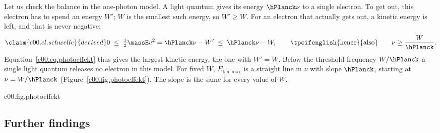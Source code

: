 Let us check the balance in the one-photon model. A light quantum gives its energy
$\hPlanck\nu$ to a single electron. To get out, this electron has to spend an energy $W'$;
$W$ is the smallest such energy, so $W' \geq W$. For an electron that actually gets out,
a kinetic energy is left, and that is never negative:
\begin{equation}\label{c00.eq.schwelle}\claim{c00.cl.schwelle}{derived}
  0 \;\leq\; \tfrac12 \massE v^2 = \hPlanck\nu - W' \;\leq\; \hPlanck\nu - W,
  \qquad \text{\tpcifenglish{hence}{also}} \qquad
  \nu \geq \frac{W}{\hPlanck} .
\end{equation}
Equation~\eqref{c00.eq.photoeffekt} thus gives the largest kinetic energy, the one with
$W' = W$. Below the threshold frequency $W/\hPlanck$ a single light quantum releases no
electron in this model. For fixed $W$, $E_{\mathrm{kin,max}}$ is a straight line in $\nu$ with slope $\hPlanck$, starting at $\nu = W/\hPlanck$
(Figure~\ref{c00.fig.photoeffekt}). The slope is the same for every value of $W$.

\begin{tpcfigure}{c00.fig.photoeffekt}
  \caption{The maximum kinetic energy~\eqref{c00.eq.photoeffekt} of the photoelectrons,
    plotted for two fixed values of the binding energy, $W_1$ (solid) and
    $W_2 = \tfrac85 W_1$ (dashed; the ratio is chosen for the picture). Both lines have the
    same slope $\hPlanck$: a frequency difference $\nu' - \nu$ goes with the energy
    difference $\hPlanck(\nu' - \nu)$. Each line starts at its threshold
    $\nu = W/\hPlanck$ from equation~\eqref{c00.eq.schwelle}. The dotted continuations meet
    the axis at $-W$; there the kinetic energy would be negative.}
\end{tpcfigure}

\subsection{Further findings}\label{c00.s4.3}

